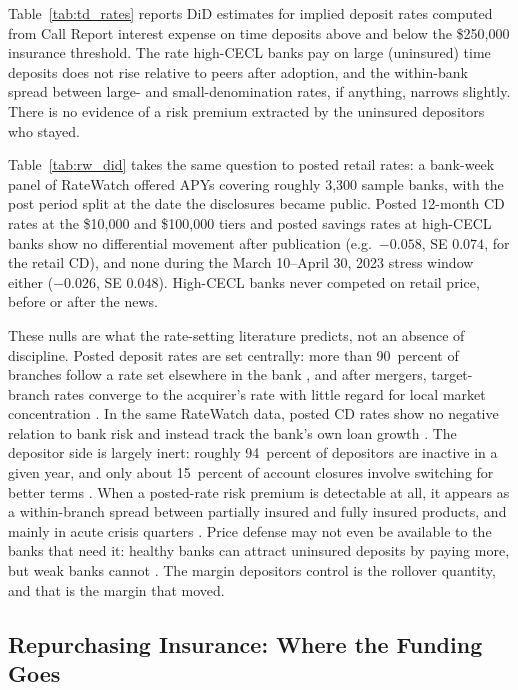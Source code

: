 Table~\ref{tab:td_rates} reports DiD estimates for implied deposit
rates computed from Call Report interest expense on time deposits above
and below the \$250{,}000 insurance threshold.  The rate high-CECL
banks pay on large (uninsured) time deposits does not rise relative to
peers after adoption, and the within-bank spread between large- and
small-denomination rates, if anything, narrows slightly.  There is no
evidence of a risk premium extracted by the uninsured depositors who
stayed.

Table~\ref{tab:rw_did} takes the same question to posted retail rates:
a bank-week panel of RateWatch offered APYs covering roughly 3{,}300
sample banks, with the post period split at the date the disclosures
became public.  Posted 12-month CD rates at the \$10{,}000 and
\$100{,}000 tiers and posted savings rates at high-CECL banks show no
differential movement after publication (e.g.\ $-0.058$, SE $0.074$,
for the retail CD), and none during the March 10--April 30, 2023
stress window either ($-0.026$, SE $0.048$).  High-CECL banks never
competed on retail price, before or after the news.

These nulls are what the rate-setting literature predicts, not an
absence of discipline.  Posted deposit rates are set centrally: more
than 90~percent of branches follow a rate set elsewhere in the bank
\citep{begenau2023uniform}, and after mergers, target-branch rates
converge to the acquirer's rate with little regard for local market
concentration \citep{granja2024market}.  In the same RateWatch data,
posted CD rates show no negative relation to bank risk and instead
track the bank's own loan growth \citep{bendavid2017banks}.  The
depositor side is largely inert: roughly 94~percent of depositors are
inactive in a given year, and only about 15~percent of account
closures involve switching for better terms \citep{egan2025sleepy}.
When a posted-rate risk premium is detectable at all, it appears as a
within-branch spread between partially insured and fully insured
products, and mainly in acute crisis quarters \citep{jacewitz2018deposit}.
Price defense may not even be available to the banks that need it:
healthy banks can attract uninsured deposits by paying more, but weak
banks cannot \citep{maechler2006dynamic}.  The margin depositors
control is the rollover quantity, and that is the margin that moved.

\subsection{Repurchasing Insurance: Where the Funding Goes}
\label{sec:results:destination}

